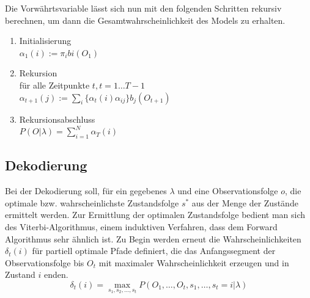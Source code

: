 Die Vorwährtsvariable lässt sich nun mit den folgenden Schritten rekursiv
berechnen, um dann die Gesamtwahrscheinlichkeit des Models zu erhalten.
\begin{enumerate}
  \item Initialisierung\\
		$\alpha_{1}(i) := \pi_{i}b{i}(O_{1})$
  \item Rekursion\\
	für alle Zeitpunkte $t, t=1 \ldots T-1$\\
	$\alpha_{t+1}(j) :=
	\sum\limits_{i}\{\alpha_{t}(i)\alpha_{ij}\}b_{j}(O_{t+1})$
  \item Rekursionsabschluss\\
  	$P(O|\lambda) = \sum\limits_{i=1}^N \alpha_{T}(i)$
\end{enumerate}


\subsection{Dekodierung}
\label{sec:decod}
Bei der Dekodierung soll, für ein gegebenes $\lambda$ und eine Observationsfolge $o$, die optimale bzw. wahrscheinlichste Zustandsfolge
$s^*$ aus der Menge der Zustände ermittelt werden. Zur Ermittlung der optimalen Zustandsfolge bedient man sich des Viterbi-Algorithmus, einem induktiven Verfahren, dass dem Forward Algorithmus sehr ähnlich ist. Zu Begin werden erneut die Wahrscheinlichkeiten $\delta_{t}(i)$ für partiell optimale Pfade definiert, die das Anfangssegment der Observationsfolge bis $O_{t}$ mit maximaler Wahrscheinlichkeit erzeugen und in Zustand $i$ enden.
\begin{equation}
\delta_{t}(i) =
\max\limits_{s_{1},s_{2}, \ldots
,s_{t}}P(O_{1},\ldots,O_{t},s_{1},\ldots,s_{t}=i|\lambda) 
\end{equation}

